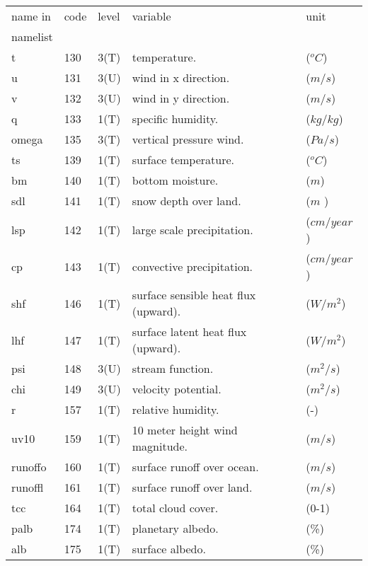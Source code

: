 \begin{tabular}{lllll} 
name in & code   & level   &variable		  	&    unit           \\ 
namelist  \\ 
\hline 
 t     &  130   &  3(T)	&temperature.		        &   ($^oC$)         \\ 
 u     &  131   &  3(U)	&wind in x direction.		&    ($m/s$)        \\
 v     &  132   &  3(U)	&wind in y direction.		&    ($m/s$)        \\
 q     &  133   &  1(T)	&specific humidity.		&    ($kg/kg$)      \\
 omega &  135   &  3(T)	&vertical pressure wind.	&    ($Pa/s$)       \\
 ts    &  139   &  1(T)	&surface temperature.		&    ($^oC$)        \\
 bm    &  140   &  1(T)	&bottom moisture.               &    ($m$)          \\
 sdl    & 141   &  1(T)	&snow depth over land.          &    ($m$ )         \\
 lsp  &   142   &  1(T)	&large scale precipitation.     &    ($cm/year$)    \\
 cp   &   143   &  1(T)	&convective precipitation.	&    ($cm/year$)    \\
 shf  &   146   &  1(T)	&surface sensible heat flux (upward).	&    ($W/m^2$)  \\
 lhf  &   147   &  1(T)	&surface latent heat flux (upward).	&    ($W/m^2$)  \\
 psi  &   148   &  3(U)	&stream function.		&    ($m^2/s$)      \\
 chi  &   149   &  3(U)	&velocity potential.		&    ($m^2/s$)      \\
 r    &   157   &  1(T)	&relative humidity.		&    (-)            \\
 uv10  &  159   &  1(T) &10 meter height wind magnitude.&    ($m/s$)        \\        
 runoffo& 160   &  1(T) &surface runoff over ocean.     &    ($m/s$)        \\    
 runoffl& 161   &  1(T) &surface runoff over land.      &    ($m/s$)        \\
 tcc    & 164   &  1(T) &total cloud cover.             &    (0-1)          \\
 palb   & 174   &  1(T)	&planetary albedo.              &    (\%)           \\
 alb   &  175   &  1(T)	&surface albedo.                &    (\%)           \\

\end{tabular}
